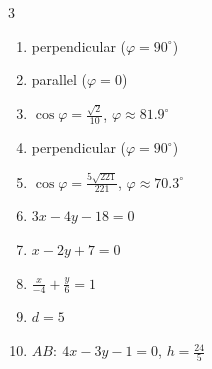 \begin{multicols}{3}\raggedright
\begin{enumerate}[label=\arabic*., leftmargin=*, itemsep=1pt]
\item perpendicular ($\varphi=90^\circ$)
\item parallel ($\varphi=0$)
\item $\cos\varphi=\frac{\sqrt{2}}{10}$, $\varphi\approx81.9^\circ$
\item perpendicular ($\varphi=90^\circ$)
\item $\cos\varphi=\frac{5 \sqrt{221}}{221}$, $\varphi\approx70.3^\circ$
\item $3x-4y-18=0$
\item $x-2y+7=0$
\item $\frac{x}{-4}+\frac{y}{6}=1$
\item $d=5$
\item $AB:\ 4x-3y-1=0$, $h=\frac{24}{5}$
\end{enumerate}
\end{multicols}


